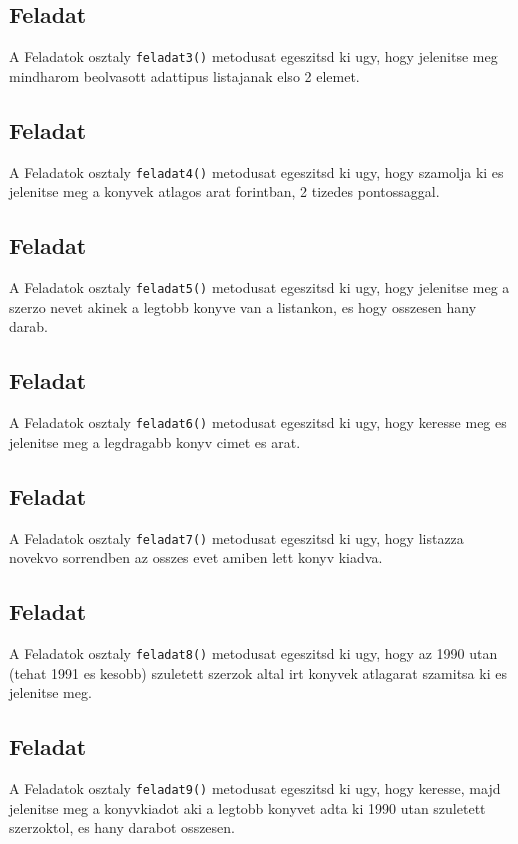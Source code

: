 \documentclass{article}
\let\l\lstinline
\begin{document}
\subsection{Feladat}
A Feladatok osztaly \l{feladat3()} metodusat egeszitsd ki ugy, hogy jelenitse meg mindharom beolvasott adattipus listajanak elso 2 elemet.

\subsection{Feladat}
A Feladatok osztaly \l{feladat4()} metodusat egeszitsd ki ugy, hogy szamolja ki es jelenitse meg a konyvek atlagos arat forintban, 2 tizedes pontossaggal.

\subsection{Feladat}
A Feladatok osztaly \l{feladat5()} metodusat egeszitsd ki ugy, hogy jelenitse meg a szerzo nevet akinek a legtobb konyve van a listankon, es hogy osszesen hany darab.

\subsection{Feladat}
A Feladatok osztaly \l{feladat6()} metodusat egeszitsd ki ugy, hogy keresse meg es jelenitse meg a legdragabb konyv cimet es arat.

\subsection{Feladat}
A Feladatok osztaly \l{feladat7()} metodusat egeszitsd ki ugy, hogy listazza novekvo sorrendben az osszes evet amiben lett konyv kiadva.

\subsection{Feladat}
A Feladatok osztaly \l{feladat8()} metodusat egeszitsd ki ugy, hogy az 1990 utan (tehat 1991 es kesobb) szuletett szerzok altal irt konyvek atlagarat szamitsa ki es jelenitse meg.

\subsection{Feladat}
A Feladatok osztaly \l{feladat9()} metodusat egeszitsd ki ugy, hogy keresse, majd jelenitse meg a konyvkiadot aki a legtobb konyvet adta ki 1990 utan szuletett szerzoktol, es hany darabot osszesen.
\end{document}

